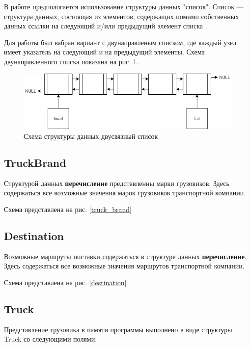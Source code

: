 В работе предпологается использование структуры данных "список".
Список --- структура данных, состоящая из элементов, 
содержащих помимо собственных данных ссылки на 
следующий и/или предыдущий элемент списка \cite{list_defenition}.

Для работы был вабран вариант с двунаправленым списком, 
где каждый узел имеет указатель на следующий и на предыдущий элементы.
Схема двунаправленного списка показана на рис. \ref{list_schema}.

\begin{figure}[hpt!]
    \centering
    \includegraphics[width=1\linewidth]{photo/list_schema}
    \caption{Схема структуры данных двусвязный список}
    \label{list_schema}
\end{figure}

\subsection{TruckBrand}

Структурой данных \textbf{перечисление} представленны марки грузовиков.
Здесь содержаться все возможные значения марок грузовиков транспортной компании. 

Схема представлена на рис. \ref{truck_brand}


\subsection{Destination}


Возможные маршруты поставки содержаться в структуре данных  \textbf{перечисление}.
Здесь содержаться все возможные значения маршрутов транспортной компании. 

Схема представлена на рис. \ref{destination}


\subsection{Truck}

Представление грузовика в памяти программы выполнено в виде структуры Truck со следующими полями:


